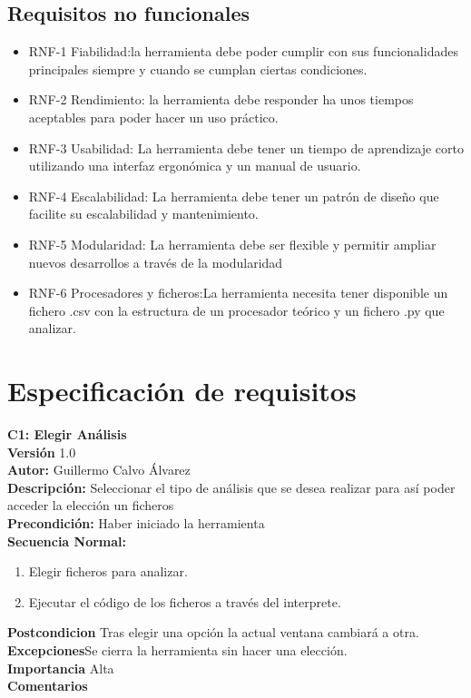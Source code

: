 \subsection{Requisitos no funcionales}
\begin{itemize}
	\item RNF-1 Fiabilidad:la herramienta debe poder cumplir con sus funcionalidades principales siempre y cuando se cumplan ciertas condiciones.
	\item RNF-2 Rendimiento: la herramienta debe responder ha unos tiempos aceptables para poder hacer un uso práctico.
	\item RNF-3 Usabilidad: La herramienta debe tener un tiempo de aprendizaje corto utilizando una interfaz ergonómica y un manual de usuario.
	\item RNF-4 Escalabilidad: La herramienta debe tener un patrón de diseño que facilite su escalabilidad y mantenimiento.
	\item RNF-5 Modularidad: La herramienta debe ser flexible y permitir ampliar nuevos desarrollos a través de la modularidad
	\item RNF-6 Procesadores y ficheros:La herramienta necesita tener disponible un fichero .csv con la estructura de un procesador teórico y un fichero .py que analizar.
	
\end{itemize}
\section{Especificación de requisitos}

\textbf{C1: Elegir Análisis}\\
\textbf{Versión} 1.0\\
\textbf{Autor:}  Guillermo Calvo Álvarez\\
\textbf{Descripción:} Seleccionar el tipo de análisis que se desea realizar para así poder acceder la elección un ficheros\\
\textbf{Precondición:} Haber iniciado la herramienta\\
\textbf{Secuencia Normal:}\\
\begin{enumerate}
	\item Elegir ficheros para analizar.
	\item Ejecutar el código de los ficheros a través del interprete. 
\end{enumerate}
\textbf{Postcondicion} Tras elegir una opción la actual ventana cambiará a otra.\\
\textbf{Excepciones}Se cierra la herramienta sin hacer una elección.\\
\textbf{Importancia} Alta\\
\textbf{Comentarios}\\

